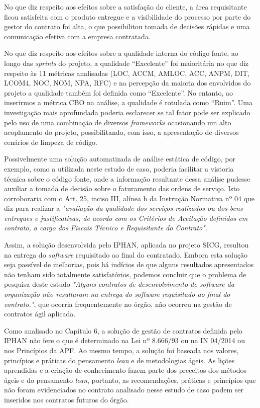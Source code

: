 No que diz respeito aos efeitos sobre a satisfação do cliente, a área requisitante ficou satisfeita com o produto entregue e a visibilidade do processo por parte do gestor do contrato foi alta, o que possibilitou tomada de decisões rápidas e uma comunicação efetiva com a empresa contratada.
 
No que diz respeito aos efeitos sobre a qualidade interna do código fonte, ao longo das \textit{sprints} do projeto, a qualidade “Excelente” foi maioritária no que diz respeito às 11 métricas analisadas (LOC, ACCM, AMLOC, ACC, ANPM, DIT, LCOM4, NOC, NOM, NPA, RFC) e na percepção da maioria dos envolvidos do projeto a qualidade também foi definida como “Excelente”. No entanto, ao inserirmos a métrica CBO na análise, a qualidade é rotulada como “Ruim”. Uma investigação mais aprofundada poderia esclarecer se tal fator pode ser explicado pelo uso de uma combinação de diversos \textit{frameworks} ocasionando um alto acoplamento do projeto, possibilitando, com isso, a apresentação de diversos cenários de limpeza de código. 

Possivelmente uma solução automatizada de análise estática de código, por exemplo, como a utilizada neste estudo de caso, poderia facilitar a vistoria técnica sobre o código fonte, onde a informação resultante dessa análise pudesse auxiliar a tomada de decisão sobre o faturamento das ordens de serviço. Isto corroboraria com o Art. 25, inciso III, alínea b da Instrução Normativa nº 04 \cite{IN04:2010} que diz para realizar a \textit{"avaliação da qualidade dos serviços realizados ou dos bens entregues e justificativas, de acordo com os Critérios de Aceitação definidos em contrato, a cargo dos Fiscais Técnico e Requisitante do Contrato"}.

Assim, a solução desenvolvida pelo IPHAN, aplicada no projeto SICG, resultou na entrega do \textit{software} requisitado ao final do contratado.  Embora esta solução seja passível de melhorias, pois há indícios de que alguns resultados apresentados não tenham sido totalmente satisfatórios, podemos concluir que o problema de pesquisa deste estudo \textit{"Alguns contratos de desenvolvimento de \textit{software} da organização não resultaram na entrega do \textit{software} requisitado ao final do contrato."}, que ocorria frequentemente no órgão, não ocorreu na gestão de contratos ágil aplicada.

Como analisado no Capítulo 6, a solução de gestão de contratos definida pelo IPHAN não fere o que é determinado na Lei nº 8.666/93 ou na IN 04/2014  ou nos Princípios da APF. Ao mesmo tempo, a solução foi baseada nos valores, princípios e práticas do pensamento \textit{lean} e de metodologias ágeis. As lições aprendidas e a criação de conhecimento fazem parte dos preceitos dos métodos ágeis e do pensamento \textit{lean}, portanto, as recomendações, práticas e princípios que não foram evidenciados no contrato analisado nesse estudo de caso podem ser inseridos nos contratos futuros do órgão.

